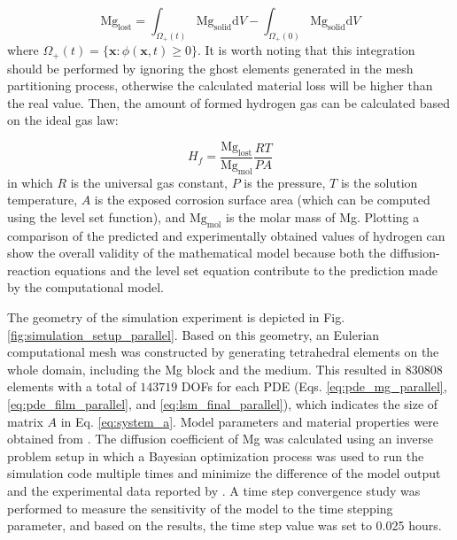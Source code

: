 \begin{equation} \label{eq:mass_loss_parallel}
\mathrm{Mg}_{\mathrm{lost}}=\int_{\Omega_{+}(t)} \mathrm{Mg}_{\mathrm{solid}} \mathrm{d} V-\int_{\Omega_{+}(0)} \mathrm{Mg}_{\mathrm{solid}} \mathrm{d} V
\end{equation}
where $\Omega_{+}(t)=\{\mathbf{x}: \phi(\mathbf{x}, t) \geq 0\}$. It is worth noting that this integration should be performed by ignoring the ghost elements generated in the mesh partitioning process, otherwise the calculated material loss will be higher than the real value. Then, the amount of formed hydrogen gas can be calculated based on the ideal gas law:

\begin{equation} \label{eq:evolv_hydr_parallel}
H_{f}=\frac{\mathrm{Mg}_{\mathrm{lost}}}{\mathrm{Mg}_{\mathrm{mol}}} \frac{R T}{P A}
\end{equation}
in which $R$ is the universal gas constant, $P$ is the pressure, $T$ is the solution temperature, $A$ is the exposed corrosion surface area (which can be computed using the level set function), and $\mathrm{Mg}_{\mathrm{mol}}$ is the molar mass of Mg. Plotting a comparison of the predicted and experimentally obtained values of hydrogen can show the overall validity of the  mathematical model because both the diffusion-reaction equations and the level set equation contribute to the prediction made by the computational model.

The geometry of the simulation experiment is depicted in Fig. \ref{fig:simulation_setup_parallel}. Based on this geometry, an Eulerian computational mesh was constructed by generating tetrahedral elements on the whole domain, including the Mg block and the medium. This resulted in $\num{830808}$ elements with a total of $\num{143719}$ DOFs for each \gls{PDE} (Eqs. \ref{eq:pde_mg_parallel}, \ref{eq:pde_film_parallel}, and \ref{eq:lsm_final_parallel}), which indicates the size of matrix $A$ in Eq. \ref{eq:system_a}. Model parameters and material properties were obtained from \cite{Bajger2016}. The diffusion coefficient of Mg was calculated using an inverse problem setup in which a Bayesian optimization process \cite{Mockus1989} was used to run the simulation code multiple times and minimize the difference of the model output and the experimental data reported by  \cite{Mei2019}. A time step convergence study was performed to measure the sensitivity of the model to the time stepping parameter, and based on the results, the time step value was set to 0.025 hours.


